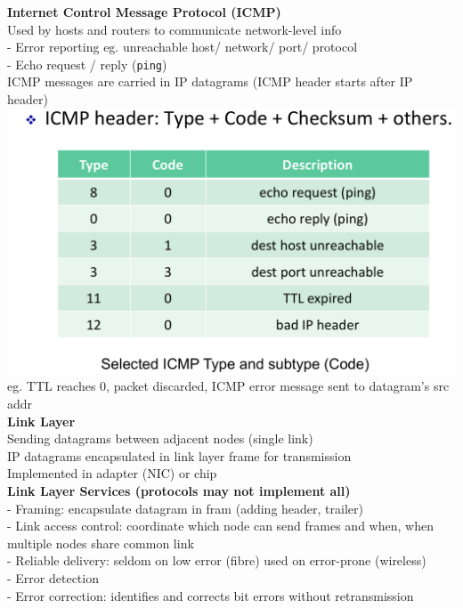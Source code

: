 \documentclass[10pt, a4paper]{article}
\newcommand{\blue}[1]{{\color{MidnightBlue}#1}}
\begin{document}
\begin{multicols*}{3}
		\textbf{Internet Control Message Protocol (ICMP)}\\
		Used by hosts and routers to communicate network-level info\\
		- Error reporting eg. unreachable host/ network/ port/ protocol\\
		- Echo request / reply (\texttt{ping})\\
		ICMP messages are carried in IP datagrams (ICMP header starts after IP header)\\
		\includegraphics[scale=.14]{./assets/icmp}\\
		eg. TTL reaches 0, packet discarded, ICMP error message sent to datagram's src addr\\

		{\normalsize\textbf{Link Layer}}\\
		Sending datagrams between adjacent nodes (single link)\\
		IP datagrams encapsulated in link layer frame for transmission\\
		Implemented in adapter (NIC) or chip\\

		\textbf{Link Layer Services (protocols may not implement all)}\\
		- \blue{Framing}: encapsulate datagram in fram (adding header, trailer)\\
		- \blue{Link access control}: coordinate which node can send frames and when, when multiple nodes share common link\\
		- \blue{Reliable delivery}: seldom on low error (fibre) used on error-prone (wireless)\\
		- \blue{Error detection}\\
		- \blue{Error correction}: identifies and corrects bit errors without retransmission\\


\end{multicols*}
\end{document}
